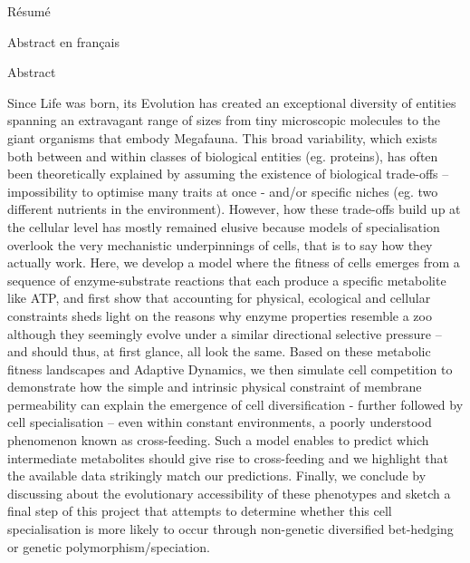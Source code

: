 \Large
 \begin{center}
Résumé \\ 
\hspace{20pt}

\end{center}

\normalsize

Abstract en français

\newpage

\Large
 \begin{center}
Abstract \\ 
\hspace{20pt}

\end{center}

\normalsize

Since Life was born, its Evolution has created an exceptional diversity of entities spanning an extravagant range of sizes from tiny microscopic molecules to the giant organisms that embody Megafauna. This broad variability, which exists both between and within classes of biological entities (eg. proteins), has often been theoretically explained  by  assuming the existence of biological trade-offs – impossibility to optimise many traits at once - and/or specific niches (eg. two different nutrients in the environment). However, how these trade-offs build up at the cellular level has mostly remained elusive because models  of specialisation overlook the very mechanistic underpinnings of cells, that is to say how they actually work. Here, we develop a model where the fitness of cells emerges from a sequence of enzyme-substrate reactions that each produce a specific metabolite like ATP, and first show that accounting for physical, ecological and cellular constraints sheds light on the reasons why enzyme properties  resemble a zoo although they seemingly evolve under a similar directional selective pressure – and should thus, at first glance, all look the same. Based on these metabolic fitness landscapes and Adaptive Dynamics, we then simulate cell competition to demonstrate how the simple and intrinsic physical constraint of membrane permeability can explain the emergence of cell diversification - further followed by cell specialisation – even within constant environments, a poorly understood phenomenon known as cross-feeding. Such a model enables to predict which intermediate metabolites should give rise to cross-feeding and we highlight that the available data strikingly match our predictions. Finally, we conclude by discussing about the evolutionary accessibility of these phenotypes  and sketch a final step of this project that attempts to determine whether this cell specialisation is more likely to occur through non-genetic diversified bet-hedging or genetic polymorphism/speciation.

\newpage